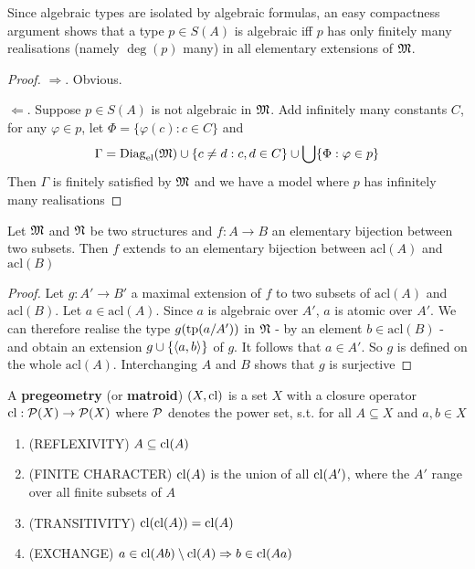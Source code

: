 \documentclass[11pt]{article}
\def \acl {\text{acl}}
\begin{document}
\begin{remark}
\label{re5.6.3}
Since algebraic types are isolated by algebraic formulas, an easy compactness argument shows that
a type \(p\in S(A)\) is algebraic iff \(p\) has only finitely many realisations (namely \(\deg(p)\)
many) in all elementary extensions of \(\mathfrak{M}\).
\end{remark}

\begin{proof}
\(\Rightarrow\). Obvious.

\(\Leftarrow\). Suppose \(p\in S(A)\) is not algebraic in \(\mathfrak{M}\). Add infinitely many constants \(C\), for
any \(\varphi\in p\), let \(\Phi=\{\varphi(c):c\in C\}\) and
\begin{equation*}
 \Gamma=\operatorname{Diag}_{\operatorname{el}}(\mathfrak{M})\cup\{c\neq d:c,d\in C\}\cup\bigcup\{\Phi:\varphi\in p\}
\end{equation*}
Then \(\Gamma\) is finitely satisfied by \(\mathfrak{M}\) and we have a model where \(p\) has infinitely many realisations
\end{proof}

\begin{lemma}[]
\label{lemma5.6.4}
Let \(\mathfrak{M}\) and \(\mathfrak{N}\) be two structures and \(f:A\to B\) an elementary bijection between two subsets.
Then \(f\) extends to an elementary bijection between \(\acl(A)\) and \(\acl(B)\)
\end{lemma}

\begin{proof}
Let \(g:A'\to B'\) a maximal extension of \(f\) to two subsets of \(\acl(A)\) and \(\acl(B)\).
Let \(a\in \acl(A)\). Since \(a\) is algebraic over \(A'\), \(a\) is atomic over \(A'\). We can
therefore realise the type \(g(\operatorname{tp}(a/ A'))\) in \(\mathfrak{N}\) - by an element \(b\in\acl(B)\) - and obtain
an extension \(g\cup\{\langle a,b\rangle\}\) of \(g\). It follows that \(a\in A'\). So \(g\) is defined on the
whole \(\acl(A)\). Interchanging \(A\) and \(B\) shows that \(g\) is surjective
\end{proof}

\begin{definition}[]
A \textbf{pregeometry} (or \textbf{matroid}) \((X,\operatorname{\text{cl}})\) is a set \(X\) with a closure operator \(\operatorname{\text{cl}}:\mathcal{P}(X)\to\mathcal{P}(X)\)
where \(\mathcal{P}\) denotes the power set, s.t. for all \(A\subseteq X\) and \(a,b\in X\)
\begin{enumerate}
\item (REFLEXIVITY) \(A\subseteq\operatorname{\text{cl}}(A)\)
\item (FINITE CHARACTER) \(\operatorname{\text{cl}}(A)\) is the union of all \(\operatorname{\text{cl}}(A')\), where the \(A'\) range over all
finite subsets of \(A\)
\item (TRANSITIVITY) \(\operatorname{\text{cl}}(\operatorname{\text{cl}}(A))=\operatorname{\text{cl}}(A)\)
\item (EXCHANGE) \(a\in\operatorname{\text{cl}}(Ab)\setminus\operatorname{\text{cl}}(A)\Rightarrow b\in\operatorname{\text{cl}}(Aa)\)
\end{enumerate}
\end{definition}
\end{document}
